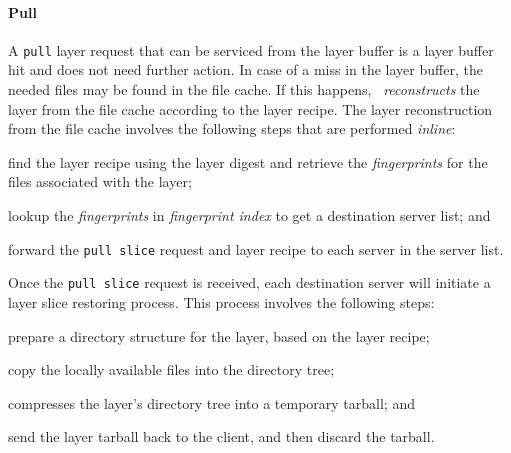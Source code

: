 %
%
%

\paragraph{Pull}
A \texttt{pull} layer request that can be serviced from the 
layer buffer is a layer buffer hit and does not need further action. 
In case of a miss in the layer buffer, the needed files may be found in the 
file cache. If this happens, 
 \sysname~\emph{reconstructs} the layer from the file cache according to the layer recipe.
%
%
The layer reconstruction from the file cache involves the following steps that are performed \emph{inline}:

\begin{compactenumerate}
	\item find the layer recipe using the layer digest and retrieve the 
\emph{fingerprints} for the files associated with the layer;
	\item lookup the \emph{fingerprints} in \emph{fingerprint index} to get a destination server list; and
	\item forward the \texttt{pull slice} %
	request and layer recipe to each server in the server list.
\end{compactenumerate}

Once the \texttt{pull slice} 
request is received, each destination server will initiate a layer slice restoring process. This process involves  
the following steps: 

\begin{compactenumerate}
	\item prepare a directory structure for the layer, based on the layer recipe;
	\item copy the locally available files into the directory tree; 
	\item compresses the layer's directory tree into a temporary tarball; and
	\item send the layer tarball back to the client, and then discard the tarball.
\end{compactenumerate}


